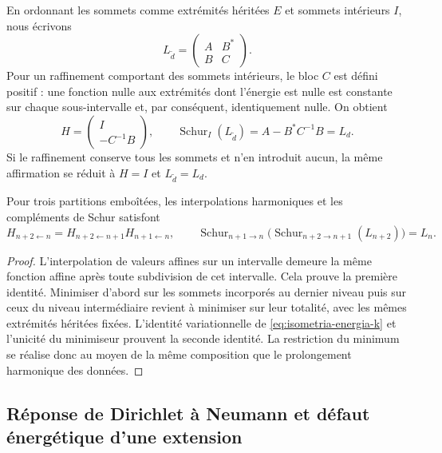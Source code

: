 En ordonnant les sommets comme extrémités héritées \(E\) et sommets intérieurs \(I\), nous écrivons
\[
 L_{\widetilde d}=\begin{pmatrix}A&B^*\\B&C\end{pmatrix}.
\]
Pour un raffinement comportant des sommets intérieurs, le bloc \(C\) est défini positif : une fonction nulle aux extrémités dont l'énergie est nulle est constante sur chaque sous-intervalle et, par conséquent, identiquement nulle. On obtient
\begin{equation}
 H=\begin{pmatrix}I\\-C^{-1}B\end{pmatrix},\qquad
 \operatorname{Schur}_{I}(L_{\widetilde d})
 =A-B^*C^{-1}B=L_d.
 \label{eq:schur-intervalar-k}
\end{equation}
Si le raffinement conserve tous les sommets et n'en introduit aucun, la même affirmation se réduit à \(H=I\) et \(L_{\widetilde d}=L_d\).

\begin{proposition}
\label{prop:energia-naturalidad-sucesiva}
Pour trois partitions emboîtées, les interpolations harmoniques et les compléments de Schur satisfont
\begin{equation}
 H_{n+2\leftarrow n}
 =H_{n+2\leftarrow n+1}H_{n+1\leftarrow n},
 \qquad
 \operatorname{Schur}_{n+1\to n}
 \bigl(\operatorname{Schur}_{n+2\to n+1}(L_{n+2})\bigr)=L_n.
 \label{eq:energia-naturalidad-sucesiva}
\end{equation}
\end{proposition}
\begin{proof}
L’interpolation de valeurs affines sur un intervalle demeure la
même fonction affine après toute subdivision de cet intervalle.
Cela prouve la première identité. Minimiser d’abord sur les sommets
incorporés au dernier niveau puis sur ceux du niveau intermédiaire
revient à minimiser sur leur totalité, avec les mêmes extrémités héritées fixées.
L’identité variationnelle de \eqref{eq:isometria-energia-k} et l’unicité
du minimiseur prouvent la seconde identité. La restriction du minimum
se réalise donc au moyen de la même composition que le prolongement
harmonique des données.
\end{proof}

\subsection{Réponse de Dirichlet à Neumann et défaut énergétique d’une extension}

